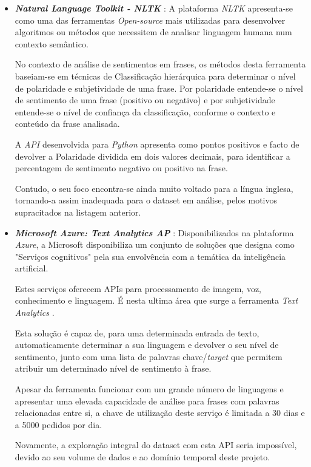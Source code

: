 \begin{itemize}
    \item \textbf{\textit{Natural Language Toolkit - NLTK}} \cite{NLTK}: A plataforma \textit{NLTK} apresenta-se como uma das ferramentas \textit{Open-source} mais utilizadas para desenvolver algoritmos ou métodos que necessitem de analisar linguagem humana num contexto semântico. 
    
    No contexto de análise de sentimentos em frases, os métodos desta ferramenta baseiam-se em técnicas de Classificação hierárquica para determinar o nível de polaridade e subjetividade de uma frase. Por polaridade entende-se o nível de sentimento de uma frase (positivo ou negativo) e por subjetividade entende-se o nível de confiança da classificação, conforme o contexto e conteúdo da frase analisada. 
    
    A \textit{API} desenvolvida para \textit{Python} \cite{NLTK-python} apresenta como pontos positivos e facto de devolver a Polaridade dividida em dois valores decimais, para identificar a percentagem de sentimento negativo ou positivo na frase. 
    
    Contudo, o seu foco encontra-se ainda muito voltado para a língua inglesa, tornando-a assim inadequada para o dataset em análise, pelos motivos supracitados na listagem anterior. 
    
    \item \textit{\textbf{Microsoft Azure: Text Analytics AP}} \cite{azure}: Disponibilizados na plataforma \textit{Azure}, a Microsoft disponibiliza um conjunto de soluções que designa como "Serviços cognitivos" pela sua envolvência com a temática da inteligência artificial. 
    
    Estes serviços oferecem APIs para processamento de imagem, voz, conhecimento e linguagem. É nesta ultima área que surge a ferramenta \textit{Text Analytics} \cite{azureAPI}.
    
    Esta solução é capaz de, para uma determinada entrada de texto, automaticamente determinar a sua linguagem e devolver o seu nível de sentimento, junto com uma lista de palavras chave/\textit{target} que permitem atribuir um determinado nível de sentimento à frase. 
    
    Apesar da ferramenta funcionar com um grande número de linguagens e apresentar uma elevada capacidade de análise para frases com palavras relacionadas entre si, a chave de utilização deste serviço é limitada a 30 dias e a 5000 pedidos por dia. 
    
    Novamente, a exploração integral do dataset com esta API seria impossível, devido ao seu volume de dados e ao domínio temporal deste projeto. 
    

\end{itemize}

